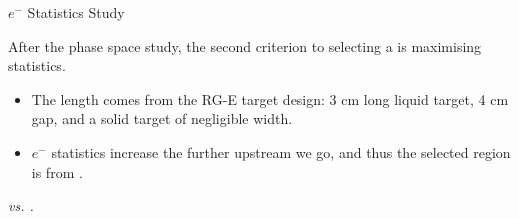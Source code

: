 \begin{frame}{$e^-$ Statistics Study}
    \label{12.21::e-_statistics_study}

    After the phase space study, the second criterion to selecting a  is maximising statistics.

    \begin{itemize}
        \item
            The length comes from the RG-E target design: 3 cm long liquid target, 4 cm gap, and a solid target of negligible width.

        \item
            $e^-$ statistics increase the further upstream we go, and thus the selected region is from .
    \end{itemize}

    \begin{center}
        \begin{figure}[t]
        \end{figure}
        \scriptsize{\textit{ vs. .}}
    \end{center}
\end{frame}

